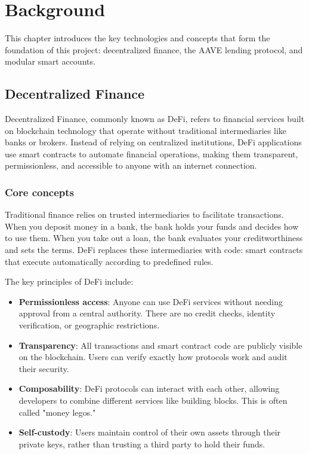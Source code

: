 \chapter{Background}
\label{chap:background}

This chapter introduces the key technologies and concepts that form the foundation of this project: decentralized finance, the AAVE lending protocol, and modular smart accounts.

\section{Decentralized Finance}

Decentralized Finance, commonly known as DeFi, refers to financial services built on blockchain technology that operate without traditional intermediaries like banks or brokers. Instead of relying on centralized institutions, DeFi applications use smart contracts to automate financial operations, making them transparent, permissionless, and accessible to anyone with an internet connection.

\subsection{Core concepts}

Traditional finance relies on trusted intermediaries to facilitate transactions. When you deposit money in a bank, the bank holds your funds and decides how to use them. When you take out a loan, the bank evaluates your creditworthiness and sets the terms. DeFi replaces these intermediaries with code: smart contracts that execute automatically according to predefined rules.

The key principles of DeFi include:

\begin{itemize}
    \item \textbf{Permissionless access}: Anyone can use DeFi services without needing approval from a central authority. There are no credit checks, identity verification, or geographic restrictions.
    \item \textbf{Transparency}: All transactions and smart contract code are publicly visible on the blockchain. Users can verify exactly how protocols work and audit their security.
    \item \textbf{Composability}: DeFi protocols can interact with each other, allowing developers to combine different services like building blocks. This is often called "money legos."
    \item \textbf{Self-custody}: Users maintain control of their own assets through their private keys, rather than trusting a third party to hold their funds.
\end{itemize}

